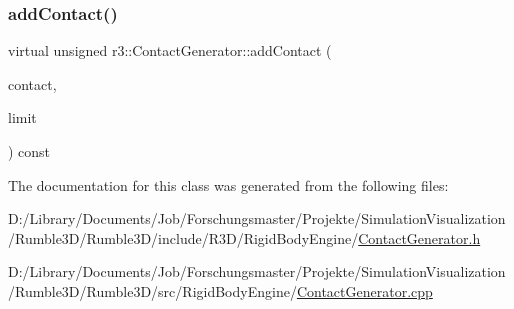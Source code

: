 \subsubsection{\texorpdfstring{add\+Contact()}{addContact()}}
{\footnotesize\ttfamily virtual unsigned r3\+::\+Contact\+Generator\+::add\+Contact (\begin{DoxyParamCaption}\item[{\mbox{\hyperlink{classr3_1_1_contact_old}{Contact\+Old}} $\ast$}]{contact,  }\item[{unsigned}]{limit }\end{DoxyParamCaption}) const\hspace{0.3cm}{\ttfamily [virtual]}}



The documentation for this class was generated from the following files\+:\begin{DoxyCompactItemize}
\item 
D\+:/\+Library/\+Documents/\+Job/\+Forschungsmaster/\+Projekte/\+Simulation\+Visualization/\+Rumble3\+D/\+Rumble3\+D/include/\+R3\+D/\+Rigid\+Body\+Engine/\mbox{\hyperlink{_contact_generator_8h}{Contact\+Generator.\+h}}\item 
D\+:/\+Library/\+Documents/\+Job/\+Forschungsmaster/\+Projekte/\+Simulation\+Visualization/\+Rumble3\+D/\+Rumble3\+D/src/\+Rigid\+Body\+Engine/\mbox{\hyperlink{_contact_generator_8cpp}{Contact\+Generator.\+cpp}}\end{DoxyCompactItemize}
